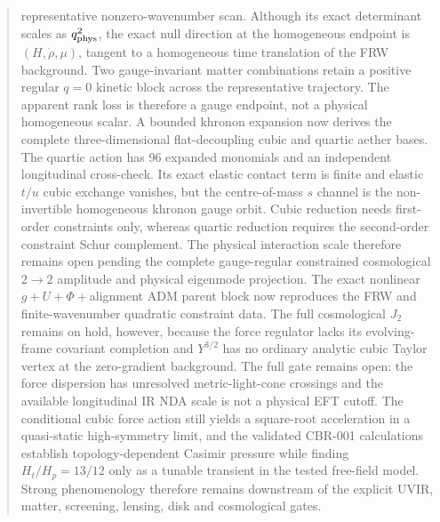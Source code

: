 ﻿\documentclass[11pt]{article}
\begin{document}
\begin{abstract}
representative nonzero-wavenumber scan.  Although its exact determinant scales
as $q_{\rm phys}^2$, the exact null direction at the homogeneous endpoint is
$(H,\dot\rho,\mu)$, tangent to a homogeneous time translation of the FRW
background.  Two gauge-invariant matter combinations retain a positive regular
$q=0$ kinetic block across the representative trajectory.  The apparent rank
loss is therefore a gauge endpoint, not a physical homogeneous scalar.  A
bounded khronon expansion now derives the complete three-dimensional
flat-decoupling cubic and quartic aether bases.  The quartic action has 96
expanded monomials and an independent longitudinal cross-check.  Its exact
elastic contact term is finite and elastic $t/u$ cubic exchange vanishes, but
the centre-of-mass $s$ channel is the non-invertible homogeneous khronon gauge
orbit.  Cubic reduction needs first-order constraints only, whereas quartic
reduction requires the second-order constraint Schur complement.  The physical
interaction scale therefore remains open pending the complete gauge-regular
constrained cosmological $2\to2$ amplitude and physical eigenmode projection.
The exact nonlinear $g+U+\Phi+$alignment ADM parent block now reproduces the
FRW and finite-wavenumber quadratic constraint data.  The full cosmological
$J_2$ remains on hold, however, because the force regulator lacks its
evolving-frame covariant completion and $Y^{3/2}$ has no ordinary analytic
cubic Taylor vertex at the zero-gradient background.  The full gate remains
open: the force dispersion has unresolved
metric-light-cone crossings and the available longitudinal IR NDA scale is
not a physical EFT cutoff.  The conditional cubic force action still yields a
square-root acceleration in a quasi-static high-symmetry limit, and the
validated CBR-001 calculations establish topology-dependent Casimir pressure
while finding $H_t/H_p=13/12$ only as a tunable transient in the tested
free-field model.  Strong phenomenology therefore remains downstream of the
explicit UVIR, matter, screening, lensing, disk and cosmological gates.
\end{abstract}

\tableofcontents











\end{document}
